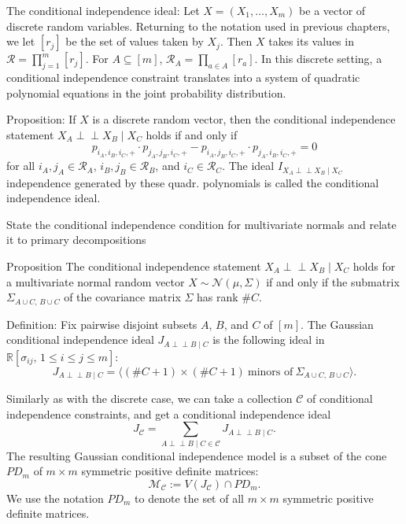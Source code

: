 The conditional independence ideal:
Let \( X = (X_1, \ldots, X_m) \) be a vector of discrete random variables. 
Returning to the notation used in previous chapters, we let \([r_j]\) be the set of values taken by \(X_j\). 
Then \(X\) takes its values in \(\mathcal{R} = \prod_{j=1}^m [r_j]\). 
For \(A \subseteq [m]\), \(\mathcal{R}_A = \prod_{a \in A} [r_a]\). 
In this discrete setting, a conditional independence constraint translates into a system of quadratic polynomial equations in the 
joint probability distribution.

Proposition: 
If \(X\) is a discrete random vector, then the conditional independence statement \(X_A \perp\!\!\!\perp X_B \mid X_C\) holds if and only if
\[
p_{i_A, i_B, i_C, +} \cdot p_{j_A, j_B, i_C, +}
-
p_{i_A, j_B, i_C, +}
\cdot
p_{j_A, i_B, i_C, +}
=
0
\]
for all \(i_A, j_A \in \mathcal{R}_A\), \(i_B, j_B \in \mathcal{R}_B\), and \(i_C \in \mathcal{R}_C\).
The ideal \( I_{X_A \perp\!\!\!\perp X_B \mid X_C} \)independence generated by these quadr. polynomials is called the conditional independence ideal.


State the conditional independence condition for multivariate normals and relate it to primary decompositions

Proposition
The conditional independence statement \( X_A \perp\!\!\!\perp X_B \mid X_C \) holds for a multivariate normal random vector 
\( X \sim \mathcal{N}(\mu, \Sigma) \) if and only if the submatrix \( \Sigma_{A \cup C,\, B \cup C} \) of the covariance matrix \( \Sigma \) 
has rank \(\# C\).

Definition:
Fix pairwise disjoint subsets \(A\), \(B\), and \(C\) of \([m]\). The Gaussian conditional independence ideal 
\(J_{A \perp\!\!\!\perp B \mid C}\) is the following ideal in \(\mathbb{R}[ \sigma_{ij},\, 1 \leq i \leq j \leq m ]\):
\[
J_{A \perp\!\!\!\perp B \mid C} = \langle (\#C + 1) \times (\#C + 1)\ \text{minors of}\ \Sigma_{A \cup C,\, B \cup C} \rangle.
\]


Similarly as with the discrete case, 
we can take a collection \(\mathcal{C}\) of conditional independence constraints, and get a conditional independence ideal
\[
J_{\mathcal{C}} = \sum_{A \perp\!\!\!\perp B \mid C \in \mathcal{C}} J_{A \perp\!\!\!\perp B \mid C}.
\]
The resulting Gaussian conditional independence model is a subset of the cone \(PD_m\) of \(m \times m\) symmetric positive definite matrices:
\[
\mathcal{M}_{\mathcal{C}} := V(J_{\mathcal{C}}) \cap PD_m.
\]
We use the notation \(PD_m\) to denote the set of all \(m \times m\) symmetric positive definite matrices.

